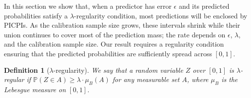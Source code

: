 \documentclass[11pt]{article}
\theoremstyle{statplain}
\theoremstyle{statdefinition}
\newtheorem{definition}[theorem]{Definition}
\newtheorem{assumption}[theorem]{Assumption}
\newcommand{\E}{\mathbb{E}}
\newcommand{\PP}{\mathbb{P}}
\newcommand{\0}{\mathbf{0}}
\newcommand{\estModel}{p} %
\newcommand{\titleShorts}{PICPIs\xspace}
\begin{document}
In this section we show that, when a predictor has error $\epsilon$ and its predicted probabilities satisfy a $\lambda$-regularity condition, most predictions will be enclosed by \titleShorts. As the calibration sample size grows, these intervals shrink while their union continues to cover most of the prediction mass; the rate depends on $\epsilon$, $\lambda$, and the calibration sample size.
Our result requires a regularity condition ensuring that the predicted probabilities are sufficiently spread across $[0,1]$.


\begin{definition}[$\lambda$-regularity]
We say that a random variable $Z$ over $[0,1]$ is $\lambda$-\emph{regular} if $\PP(Z \in A) \geq \lambda \cdot \mu_B(A)$ for any measurable set $A$, where $\mu_B$ is the Lebesgue measure on $[0,1]$.
\end{definition}
\end{document}
